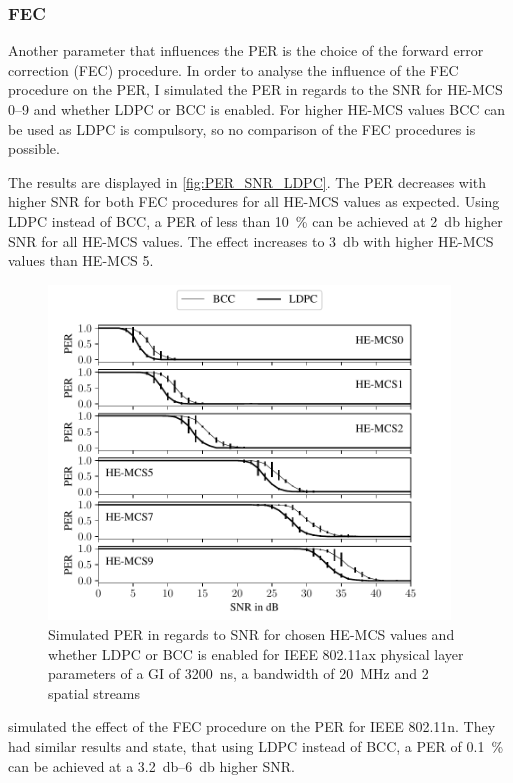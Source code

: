 \subsubsection*{\acf{FEC}}
Another parameter that influences the \ac{PER} is the choice of the forward error correction (FEC) procedure. In order to
analyse the influence of the FEC procedure on the \ac{PER}, I simulated the \ac{PER} in regards to the \ac{SNR} for HE-MCS
\numrange{0}{9} and whether \ac{LDPC} or \ac{BCC} is enabled. For higher HE-MCS values \ac{BCC} can be used as \ac{LDPC} is compulsory, so no comparison of the \ac{FEC} procedures is possible.

The results are displayed in \autoref{fig:PER_SNR_LDPC}. The \ac{PER} decreases with higher \ac{SNR} for both \ac{FEC} procedures for all HE-MCS values as
expected. Using \ac{LDPC} instead of \ac{BCC}, a \ac{PER} of less than \SI{10}{\percent} can be achieved at \SI{2}{\decibel} higher \ac{SNR}
for all HE-MCS values. The effect increases to \SI{3}{\decibel} with higher HE-MCS values than HE-MCS \num{5}.
\begin{figure}[H]%
	\centering
	\includegraphics[width=0.95\textwidth]{figures/LDPC_PER_to_SNR.pdf}
	\caption{Simulated \ac{PER} in regards to \ac{SNR} for chosen HE-\ac{MCS} values and whether \ac{LDPC} or \ac{BCC} is enabled for IEEE 802.11ax physical layer parameters of a \ac{GI} of \SI{3200}{\nano\second}, a bandwidth of \SI{20}{\mega\hertz} and 2 spatial streams}%
	\label{fig:PER_SNR_LDPC}%
\end{figure}

\textcite{syafei_performance_2009} simulated the effect of the \ac{FEC} procedure on the \ac{PER} for IEEE 802.11n. They
had similar results and state, that using \ac{LDPC} instead of \ac{BCC}, a \ac{PER} of \SI{0.1}{\percent}  can be achieved at a
\SIrange{3.2}{6}{\decibel} higher \ac{SNR}.


